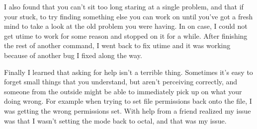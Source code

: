 \documentclass[letterpaper,10pt]{article}
\begin{document}
\begin{description}
I also found that you can't sit too long staring at a single problem, and that
if your stuck, to try finding something else you can work on until you've got a
fresh mind to take a look at the old problem you were having. In on case, I
could not get utime to work for some reason and stopped on it for a while.
After finishing the rest of another command, I went back to fix utime and it
was working because of another bug I fixed along the way.

Finally I learned that asking for help isn't a terrible thing. Sometimes it's
easy to forget small things that you understand, but aren't perceiving
correctly, and someone from the outside might be able to immediately pick up on
what your doing wrong. For example when trying to set file permissions back
onto the file, I was getting the wrong permissions set. With help from a friend
realized my issue was that I wasn't setting the mode back to octal, and that
was my issue.
\end{description}
\end{document}
